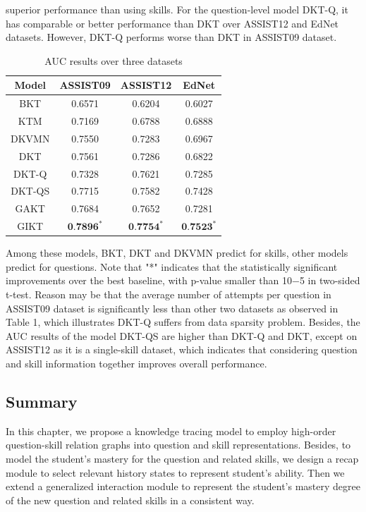 \documentclass[11pt,en]{elegantpaper}
\begin{document}
superior performance than using skills. For the question-level model DKT-Q, it has comparable or better performance than DKT over ASSIST12 and EdNet datasets. However, DKT-Q performs worse than DKT in ASSIST09 dataset. 
\begin{table}[h]
	\centering
	\caption{AUC results over three datasets}
	\label{auctb1}
	\begin{tabular}{cccc}
		\hline Model & ASSIST09 & ASSIST12 & EdNet \\
		\hline BKT & 0.6571 & 0.6204 & 0.6027 \\
		KTM & 0.7169 & 0.6788 & 0.6888 \\
		DKVMN & 0.7550 & 0.7283 & 0.6967 \\
		DKT & 0.7561 & 0.7286 & 0.6822 \\
		\hline DKT-Q & 0.7328 & 0.7621 & 0.7285 \\
		DKT-QS & 0.7715 & 0.7582 & 0.7428 \\
		GAKT & 0.7684 & 0.7652 & 0.7281 \\
		\hline GIKT & $\mathbf{0 . 7 8 9 6}^{*}$ & $\mathbf{0 . 7 7 5 4}^{*}$ & $\mathbf{0 . 7 5 2 3}^{*}$ \\
		\hline	
	\end{tabular}
\end{table}

Among these models, BKT, DKT and DKVMN predict for skills, other models predict for questions. Note that "*" indicates that the statistically significant improvements over the best baseline, with p-value smaller than 10−5 in two-sided t-test. Reason may be that the average number of attempts per question in ASSIST09 dataset is significantly less than other two datasets as observed in Table 1, which illustrates DKT-Q suffers from data sparsity problem. Besides, the AUC results of the model DKT-QS are higher than DKT-Q and DKT, except on ASSIST12 as it is a single-skill dataset, which indicates that considering question and skill information together improves overall performance.

\subsection{Summary}
In this chapter, we propose a knowledge tracing model to employ high-order question-skill relation graphs into question and skill representations. Besides, to model the student's mastery for the question and related skills, we design a recap module to select relevant history states to represent student's ability. Then we extend a generalized interaction module to represent the student's mastery degree of the new question and related skills in a consistent way. 
\end{document}
